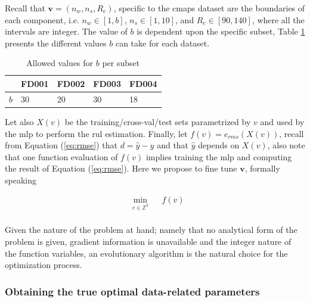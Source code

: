 \documentclass{article}
\begin{document}
Recall that $\mathbf{v} = (n_w, n_s, R_e)$, specific to the \gls{cmaps} dataset are the boundaries of each component, i.e. $n_w \in \left[1, b\right]$, $n_s \in \left[1, 10\right]$, and $R_e \in \left[90, 140 \right]$, where all the intervals are integer. The value of $b$ is dependent upon the specific subset, Table \ref{table:b_values} presents the different values $b$ can take for each dataset.

\begin{table}[!htb]
\centering
\begin{tabular}{l | l l l l}
	\hline
	 & FD001 & FD002 & FD003 & FD004\\
  	\hline
  	$b$ & 30 & 20 & 30 & 18\\
  	\hline
\end{tabular}
\caption{Allowed values for $b$ per subset}
\label{table:b_values}
\end{table}

Let also $X(v)$ be the training/cross-val/test sets parametrized by $v$ and used by the \gls{mlp} to perform the \gls{rul} estimation. Finally, let $f(v)=e_{rms}(X(v))$, recall from Equation (\ref{eq:rmse}) that $d = \hat{y} - y$ and that $\hat{y}$ depends on $X(v)$, also note that one function evaluation of $f(v)$ implies training the \gls{mlp} and computing the result of Equation (\ref{eq:rmse}). Here we propose to fine tune $\mathbf{v}$, formally speaking

\begin{equation}
\begin{aligned}
& \underset{v \in \mathbb{Z}^3}{\text{min}}
& & f(v) \\
\end{aligned}
\label{eq:optimization_problem}
\end{equation}

Given the nature of the problem at hand; namely that no analytical form of the problem is given, gradient information is unavailable and the integer nature of the function variables, an evolutionary algorithm is the natural choice for the optimization process.

\subsubsection{Obtaining the true optimal data-related parameters}
\end{document}
